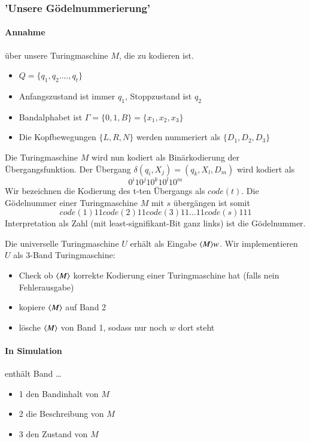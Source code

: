 \subsubsection{'Unsere Gödelnummerierung'}

\paragraph*{Annahme} über unsere Turingmaschine $M$, die zu kodieren ist.
\begin{itemize}
	\item $Q=\{q_1,q_2.\dots,q_t\}$
	\item Anfangszustand ist immer $q_1$, Stoppzustand ist $q_2$
	\item Bandalphabet ist $\Gamma=\{0,1,B\}=\{x_1,x_2,x_3\}$
	\item Die Kopfbewegungen $\{L,R,N\}$ werden nummeriert als $\{D_1,D_2,D_3\}$
\end{itemize}
Die Turingmaschine $M$ wird nun kodiert als Binärkodierung der Übergangsfunktion. Der Übergang $\delta(q_i,X_j)=(q_k,X_l,D_m)$ wird kodiert als $$0^i10^j10^k10^l10^m$$ Wir bezeichnen die Kodierung des t-ten Übergangs als $code(t)$. Die Gödelnummer einer Turingmaschine $M$ mit $s$ übergängen ist somit $$code(1)11code(2)11code(3)11 \dots 11code(s)111$$ 
Interpretation als Zahl (mit least-signifikant-Bit ganz links) ist die Gödelnummer.

\par\medskip
Die universelle Turingmaschine $U$ erhält als Eingabe $\langle M \rangle w$. Wir implementieren $U$ als 3-Band Turingmaschine:
\begin{itemize}
	\item Check ob $\langle M \rangle$ korrekte Kodierung einer Turingmaschine hat (falls nein Fehlerausgabe)
	\item kopiere $\langle M \rangle$ auf Band 2
	\item lösche $\langle M \rangle$ von Band 1, sodass nur noch $w$ dort steht
\end{itemize}

\paragraph*{In Simulation} enthält Band \dots
\begin{itemize}
	\item 1 den Bandinhalt von $M$
	\item 2 die Beschreibung von $M$
	\item 3 den Zustand von $M$
\end{itemize}

